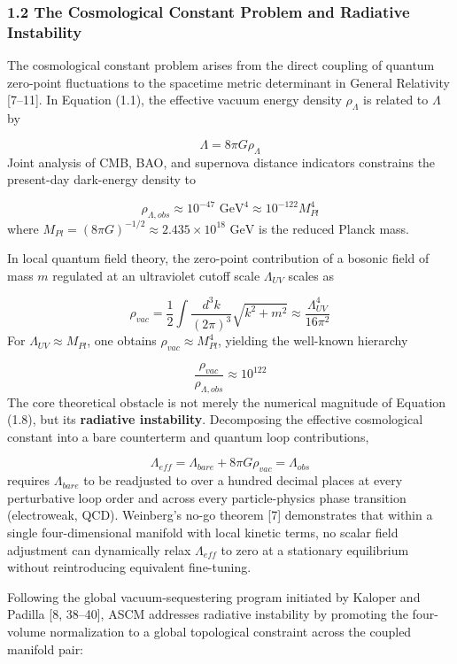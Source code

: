 \documentclass[aps,prd,onecolumn,superscriptaddress,nofootinbib,longbibliography,10pt]{revtex4-2}
\begin{document}
  
\subsubsection*{1.2 The Cosmological Constant Problem and Radiative Instability}

  The cosmological constant problem arises from the direct coupling of quantum zero-point fluctuations to the spacetime metric determinant in General Relativity [7–11]. In Equation (1.1), the effective vacuum energy density \(\rho_\Lambda\) is related to \(\Lambda\) by


  \[ \Lambda = 8\pi G \rho_\Lambda \]
  Joint analysis of CMB, BAO, and supernova distance indicators constrains the present-day dark-energy density to


  \[ \rho_{\Lambda,obs} \approx 10^{-47}\text{ GeV}^4 \approx 10^{-122} M_{Pl}^4 \]
  where \(M_{Pl} = (8\pi G)^{-1/2} \approx 2.435 \times 10^{18}\text{ GeV}\) is the reduced Planck mass.


  In local quantum field theory, the zero-point contribution of a bosonic field of mass \(m\) regulated at an ultraviolet cutoff scale \(\Lambda_{UV}\) scales as


  \[ \rho_{vac} = \frac{1}{2} \int \frac{d^3k}{(2\pi)^3} \sqrt{k^2 + m^2} \approx \frac{\Lambda_{UV}^4}{16\pi^2} \]
  For \(\Lambda_{UV} \approx M_{Pl}\), one obtains \(\rho_{vac} \approx M_{Pl}^4\), yielding the well-known hierarchy


  \[ \frac{\rho_{vac}}{\rho_{\Lambda,obs}} \approx 10^{122} \]
  The core theoretical obstacle is not merely the numerical magnitude of Equation (1.8), but its \textbf{radiative instability}. Decomposing the effective cosmological constant into a bare counterterm and quantum loop contributions,


  \[ \Lambda_{eff} = \Lambda_{bare} + 8\pi G \rho_{vac} = \Lambda_{obs} \]
  requires \(\Lambda_{bare}\) to be readjusted to over a hundred decimal places at every perturbative loop order and across every particle-physics phase transition (electroweak, QCD). Weinberg's no-go theorem [7] demonstrates that within a single four-dimensional manifold with local kinetic terms, no scalar field adjustment can dynamically relax \(\Lambda_{eff}\) to zero at a stationary equilibrium without reintroducing equivalent fine-tuning.


  Following the global vacuum-sequestering program initiated by Kaloper and Padilla [8, 38–40], ASCM addresses radiative instability by promoting the four-volume normalization to a global topological constraint across the coupled manifold pair:
\end{document}
